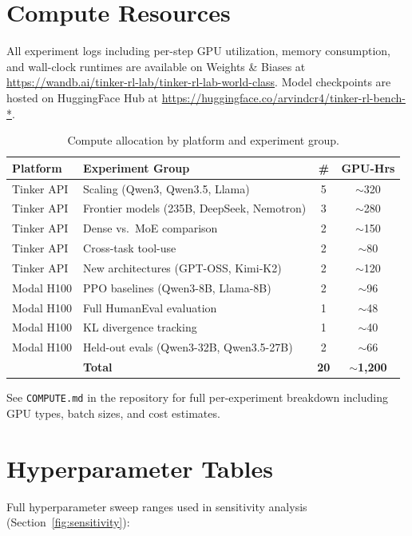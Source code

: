 \documentclass{article}
\begin{document}
\section{Compute Resources}
\label{app:compute}

All experiment logs including per-step GPU utilization, memory consumption,
and wall-clock runtimes are available on Weights \& Biases at
\url{https://wandb.ai/tinker-rl-lab/tinker-rl-lab-world-class}.
Model checkpoints are hosted on HuggingFace Hub at
\url{https://huggingface.co/arvindcr4/tinker-rl-bench-*}.

\begin{table}[htbp]
\centering
\caption{Compute allocation by platform and experiment group.}
\small
\begin{tabular}{@{}llcc@{}}
\toprule
\textbf{Platform} & \textbf{Experiment Group} & \textbf{\#} & \textbf{GPU-Hrs} \\
\midrule
Tinker API & Scaling (Qwen3, Qwen3.5, Llama) & 5 & $\sim$320 \\
Tinker API & Frontier models (235B, DeepSeek, Nemotron) & 3 & $\sim$280 \\
Tinker API & Dense vs.~MoE comparison & 2 & $\sim$150 \\
Tinker API & Cross-task tool-use & 2 & $\sim$80 \\
Tinker API & New architectures (GPT-OSS, Kimi-K2) & 2 & $\sim$120 \\
Modal H100 & PPO baselines (Qwen3-8B, Llama-8B) & 2 & $\sim$96 \\
Modal H100 & Full HumanEval evaluation & 1 & $\sim$48 \\
Modal H100 & KL divergence tracking & 1 & $\sim$40 \\
Modal H100 & Held-out evals (Qwen3-32B, Qwen3.5-27B) & 2 & $\sim$66 \\
\midrule
 & \textbf{Total} & \textbf{20} & $\sim$\textbf{1,200} \\
\bottomrule
\end{tabular}
\end{table}

See \texttt{COMPUTE.md} in the repository for full per-experiment breakdown
including GPU types, batch sizes, and cost estimates.

\section{Hyperparameter Tables}
\label{app:hyperparams}

Full hyperparameter sweep ranges used in sensitivity analysis (Section~\ref{fig:sensitivity}):
\end{document}
